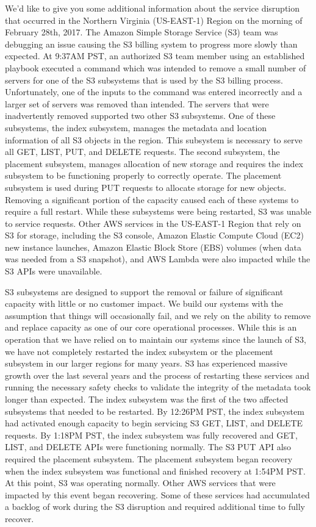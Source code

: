 \documentclass{report}
\begin{document}
\begin{spacing}{1.4}
\begin{enumerate}[leftmargin=*]
      We’d like to give you some additional information about the service disruption that occurred in the Northern Virginia (US-EAST-1) Region on the morning of February 28th, 2017. The Amazon Simple Storage Service (S3) team was debugging an issue causing the S3 billing system to progress more slowly than expected. At 9:37AM PST, an authorized S3 team member using an established playbook executed a command which was intended to remove a small number of servers for one of the S3 subsystems that is used by the S3 billing process. Unfortunately, one of the inputs to the command was entered incorrectly and a larger set of servers was removed than intended. The servers that were inadvertently removed supported two other S3 subsystems.  One of these subsystems, the index subsystem, manages the metadata and location information of all S3 objects in the region. This subsystem is necessary to serve all GET, LIST, PUT, and DELETE requests. The second subsystem, the placement subsystem, manages allocation of new storage and requires the index subsystem to be functioning properly to correctly operate. The placement subsystem is used during PUT requests to allocate storage for new objects. Removing a significant portion of the capacity caused each of these systems to require a full restart. While these subsystems were being restarted, S3 was unable to service requests. Other AWS services in the US-EAST-1 Region that rely on S3 for storage, including the S3 console, Amazon Elastic Compute Cloud (EC2) new instance launches, Amazon Elastic Block Store (EBS) volumes (when data was needed from a S3 snapshot), and AWS Lambda were also impacted while the S3 APIs were unavailable.

      S3 subsystems are designed to support the removal or failure of significant capacity with little or no customer impact. We build our systems with the assumption that things will occasionally fail, and we rely on the ability to remove and replace capacity as one of our core operational processes. While this is an operation that we have relied on to maintain our systems since the launch of S3, we have not completely restarted the index subsystem or the placement subsystem in our larger regions for many years. S3 has experienced massive growth over the last several years and the process of restarting these services and running the necessary safety checks to validate the integrity of the metadata took longer than expected. The index subsystem was the first of the two affected subsystems that needed to be restarted. By 12:26PM PST, the index subsystem had activated enough capacity to begin servicing S3 GET, LIST, and DELETE requests. By 1:18PM PST, the index subsystem was fully recovered and GET, LIST, and DELETE APIs were functioning normally.  The S3 PUT API also required the placement subsystem. The placement subsystem began recovery when the index subsystem was functional and finished recovery at 1:54PM PST. At this point, S3 was operating normally. Other AWS services that were impacted by this event began recovering. Some of these services had accumulated a backlog of work during the S3 disruption and required additional time to fully recover.


\end{enumerate}
\end{spacing}
\end{document}
